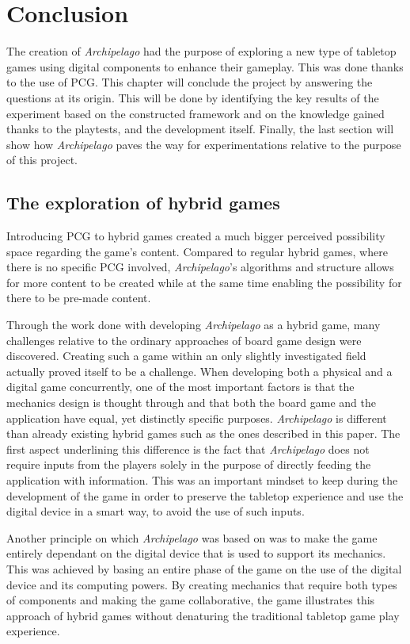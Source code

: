 \chapter{Conclusion}

The creation of \textit{Archipelago} had the purpose of exploring a new type of tabletop games using digital components to enhance their gameplay. This was done thanks to the use of PCG. This chapter will conclude the project by answering the questions at its origin. This will be done by identifying the key results of the experiment based on the constructed framework and on the knowledge gained thanks to the playtests, and the development itself. Finally, the last section will show how \textit{Archipelago} paves the way for experimentations relative to the purpose of this project.

\section{The exploration of hybrid games}
Introducing PCG to hybrid games created a much bigger perceived possibility space regarding the game's content. Compared to regular hybrid games, where there is no specific PCG involved, \textit{Archipelago}'s algorithms and structure allows for more content to be created while at the same time enabling the possibility for there to be pre-made content. 

Through the work done with developing \textit{Archipelago} as a hybrid game, many challenges relative to the ordinary approaches of board game design were discovered. Creating such a game within an only slightly investigated field actually proved itself to be a challenge. When developing both a physical and a digital game concurrently, one of the most important factors is that the mechanics design is thought through and that both the board game and the application have equal, yet distinctly specific purposes. \textit{Archipelago} is different than already existing hybrid games such as the ones described in this paper. The first aspect underlining this difference is the fact that \textit{Archipelago} does not require inputs from the players solely in the purpose of directly feeding the application with information. This was an important mindset to keep during the development of the game in order to preserve the tabletop experience and use the digital device in a smart way, to avoid the use of such inputs.

Another principle on which \textit{Archipelago} was based on was to make the game entirely dependant on the digital device that is used to support its mechanics. This was achieved by basing an entire phase of the game on the use of the digital device and its computing powers. By creating mechanics that require both types of components and making the game collaborative, the game illustrates this approach of hybrid games without denaturing the traditional tabletop game play experience.

